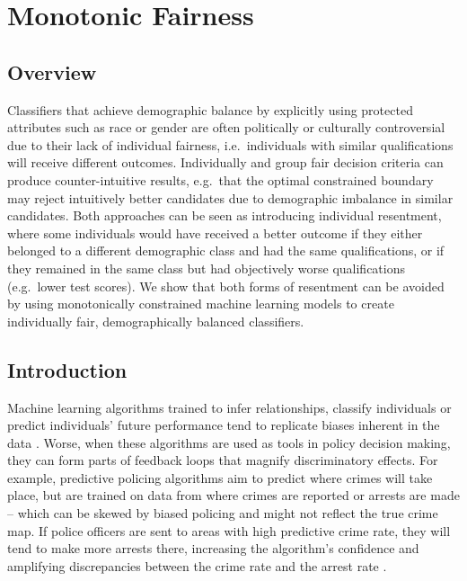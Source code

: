 \chapter{Monotonic Fairness}
\label{ch:MonoFair}

\section{Overview}

    Classifiers that achieve demographic balance by explicitly using protected attributes such as race or gender are often politically or culturally controversial due to their lack of individual fairness, i.e.\ individuals with similar qualifications will receive different outcomes. Individually and group fair decision criteria can produce counter-intuitive results, e.g.\ that the optimal constrained boundary may reject intuitively better candidates due to demographic imbalance in similar candidates. Both approaches can be seen as introducing individual resentment, where some individuals would have received a better outcome if they either belonged to a different demographic class and had the same qualifications, or if they remained in the same class but had objectively worse qualifications (e.g.\ lower test scores). We show that both forms of resentment can be avoided by using monotonically constrained machine learning models to create individually fair, demographically balanced classifiers.

\section{Introduction}
    \label{sec:monofair_intro}

    Machine learning algorithms trained to infer relationships, classify individuals or predict individuals' future performance tend to replicate biases inherent in the data \citep{Caliskan:Bryson:Narayanan:2017,Bornstein:2018,Angwin:Larson:Muttu:Kirchner:2016}. Worse, when these algorithms are used as tools in policy decision making, they can form parts of feedback loops that magnify discriminatory effects. For example, predictive policing algorithms aim to predict where crimes will take place, but are trained on data from where crimes are reported or arrests are made -- which can be skewed by biased policing and might not reflect the true crime map. If police officers are sent to areas with high predictive crime rate, they will tend to make more arrests there, increasing the algorithm's confidence and amplifying discrepancies between the crime rate and the arrest rate \citep{Ensign:2018,Lum:Isaac:2016}. 
    
